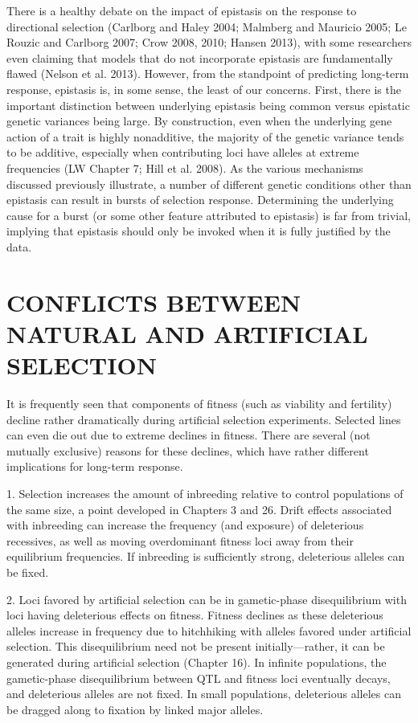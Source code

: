 \documentclass{article}
\begin{document}
There is a healthy debate on the impact of epistasis on the response to directional selection (Carlborg and Haley 2004; Malmberg and Mauricio 2005; Le Rouzic and Carlborg 2007; Crow 2008, 2010; Hansen 2013), with some researchers even claiming that models that do not incorporate epistasis are fundamentally flawed (Nelson et al. 2013). However, from the standpoint of predicting long-term response, epistasis is, in some sense, the least of our concerns. First, there is the important distinction between underlying epistasis being common versus epistatic genetic variances being large. By construction, even when the underlying gene action of a trait is highly nonadditive, the majority of the genetic variance tends to be additive, especially when contributing loci have alleles at extreme frequencies (LW Chapter 7; Hill et al. 2008). As the various mechanisms discussed previously illustrate, a number of different genetic conditions other than epistasis can result in bursts of selection response. Determining the underlying cause for a burst (or some other feature attributed to epistasis) is far from trivial, implying that epistasis should only be invoked when it is fully justified by the data.

\section{CONFLICTS BETWEEN NATURAL AND ARTIFICIAL SELECTION}
It is frequently seen that components of fitness (such as viability and fertility) decline rather dramatically during artificial selection experiments. Selected lines can even die out due to extreme declines in fitness. There are several (not mutually exclusive) reasons for these declines, which have rather different implications for long-term response.

1. Selection increases the amount of inbreeding relative to control populations of the same size, a point developed in Chapters 3 and 26. Drift effects associated with inbreeding can increase the frequency (and exposure) of deleterious recessives, as well as moving overdominant fitness loci away from their equilibrium frequencies. If inbreeding is sufficiently strong, deleterious alleles can be fixed.

2. Loci favored by artificial selection can be in gametic-phase disequilibrium with loci having deleterious effects on fitness. Fitness declines as these deleterious alleles increase in frequency due to hitchhiking with alleles favored under artificial selection. This disequilibrium need not be present initially—rather, it can be generated during artificial selection (Chapter 16). In infinite populations, the gametic-phase disequilibrium between QTL and fitness loci eventually decays, and deleterious alleles are not fixed. In small populations, deleterious alleles can be dragged along to fixation by linked major alleles.
\end{document}
